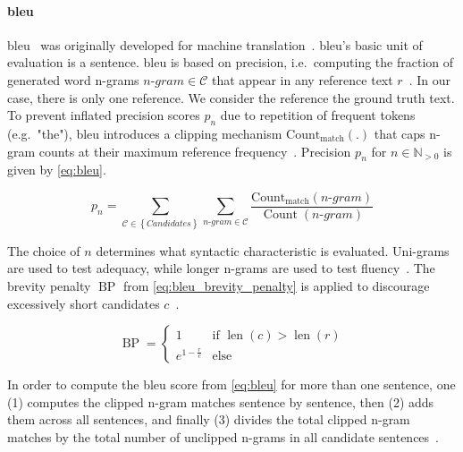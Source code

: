 \paragraph{\ac{bleu}}
\ac{bleu}~\citep{papineni_bleu_2001} was originally developed for machine translation~\citep{zhou_paraphrase_2021,anantha_pearson_metrics_2021}. 
\ac{bleu}'s basic unit of evaluation is a sentence. 
\ac{bleu} is based on precision, i.e.\ computing the fraction of generated word n-grams $n\text{-}gram \in \mathcal{C}$ that appear in any reference text $r$~\citep{kurt_pehlivanoglu_comparative_2024,palivela_optimization_2021,papineni_bleu_2001,anantha_pearson_metrics_2021}. 
In our case, there is only one reference.
We consider the reference the ground truth text.
To prevent inflated precision scores $p_n$ due to repetition of frequent tokens (e.g.\ "the"), \ac{bleu} introduces a clipping mechanism $\operatorname{Count_{match}}(.)$ that caps n-gram counts at their maximum reference frequency~\citep{papineni_bleu_2001}. 
Precision $p_n$ for $n \in \mathbb{N}_{>0}$ is given by \autoref{eq:bleu}.

\begin{equation}
    p_n = \sum_{\mathcal{C} \in \left\{ Candidates \right\}}\sum_{n\text{-}gram \in\mathcal{C}} \frac{\operatorname{Count_{match}}(n\text{-}gram)}{\operatorname{Count}(n\text{-}gram)}
\label{eq:bleu}
\end{equation}

The choice of $n$ determines what syntactic characteristic is evaluated.
Uni-grams are used to test adequacy, while longer n-grams are used to test fluency~\citep{papineni_bleu_2001}. 
The brevity penalty $\operatorname{BP}$ from \autoref{eq:bleu_brevity_penalty} is applied to discourage excessively short candidates $c$~\citep{papineni_bleu_2001}.

\begin{equation}
    \operatorname{BP} = \begin{cases}
        1 & \text{if } \operatorname{len}(c) > \operatorname{len}(r) \\
        e^{1 - \frac{r}{c}} & \text{else}
    \end{cases}
\label{eq:bleu_brevity_penalty}
\end{equation}

In order to compute the \ac{bleu} score from \autoref{eq:bleu} for more than one sentence, 
one (1) computes the clipped n-gram matches sentence by sentence, 
then (2) adds them across all sentences, 
and finally (3) divides the total clipped n-gram matches by 
the total number of unclipped n-grams in all candidate sentences~\citep{papineni_bleu_2001,cordeiro_bleu_2007}.

